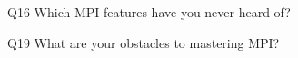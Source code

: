 \begin{description}%
\item{Q16} Which MPI features have you never heard of?%
\item{Q19} What are your obstacles to mastering MPI?%
\end{description}%
